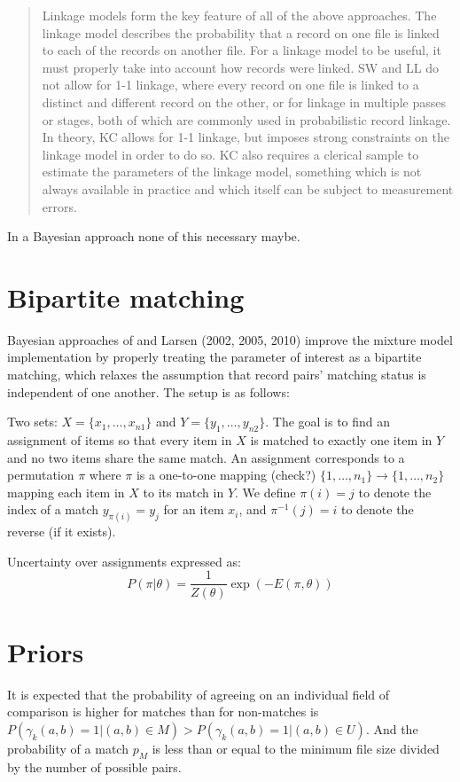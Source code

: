 \documentclass[11pt,reqno]{amsart}
\begin{document}
\begin{quote}
Linkage models form the key feature of all of the above approaches. The linkage model
describes the probability that a record on one file is linked to each of the records on another
file. For a linkage model to be useful, it must properly take into account how records were
linked. SW and LL do not allow for 1-1 linkage, where every record on one file is linked to
a distinct and different record on the other, or for linkage in multiple passes or stages,
both of which are commonly used in probabilistic record linkage. In theory, KC allows
for 1-1 linkage, but imposes strong constraints on the linkage model in order to do so.
KC also requires a clerical sample to estimate the parameters of the linkage model,
something which is not always available in practice and which itself can be subject to
measurement errors.
\end{quote}

In a Bayesian approach none of this necessary maybe. 

\section{Bipartite matching}
Bayesian approaches of \cite{fortini2001} and Larsen (2002, 2005, 2010) improve the mixture model implementation by properly treating the parameter of interest as a bipartite matching, which relaxes the assumption that record pairs' matching status is independent of one another.  The setup is as follows:

Two sets: $X = \{x_1, \dots, x_{n1}\}$ and $Y = \{y_1, \dots, y_{n2}\}$. The goal is to find an assignment of items so that every item in $X$ is matched to exactly one item in $Y$ and no two items share the same match.  An assignment corresponds to a permutation $\pi$ where $\pi$ is a one-to-one mapping (check?) $\{1, \dots, n_1\} \to \{1, \dots, n_2\}$ mapping each item in $X$ to its match in $Y$.  We define $\pi(i) = j$ to denote the index of a match $y_{\pi(i)} = y_j$ for an item $x_i$, and $\pi^{-1}(j) = i$ to denote the reverse (if it exists). 

Uncertainty over assignments expressed as:
\[ P(\pi | \theta)  = \frac{1}{Z(\theta)} \exp(-E(\pi,\theta))\]


\section{Priors} 
It is expected that the probability of agreeing on an individual field of comparison is higher for matches than for non-matches is $P(\gamma_k(a,b) = 1 | (a,b) \in M) > P (\gamma_k(a, b) = 1 | (a,b) \in U) $.  And the probability of a match $p_M$ is less than or equal to the minimum file size divided by the number of possible pairs.  
\end{document}
